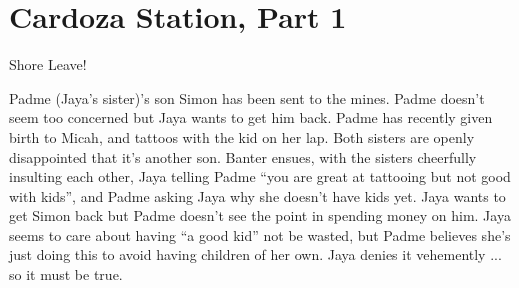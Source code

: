 \setcounter{chapter}{ 2 }
\chapter{\textbf{Cardoza Station, Part 1} }





\noindent\hrulefill





 {\LARGE Shore Leave! } 



Padme (Jaya's sister)'s son Simon has been sent to the mines.  Padme doesn't seem too concerned but Jaya wants to get him back.  Padme has recently given birth to Micah, and tattoos with the kid on her lap.  Both sisters are openly disappointed that it's another son.  Banter ensues, with the sisters cheerfully insulting each other, Jaya telling Padme ``you are great at tattooing but not good with kids'', and Padme asking Jaya why she doesn't have kids yet.  Jaya wants to get Simon back but Padme doesn't see the point in spending money on him.  Jaya seems to care about having ``a good kid'' not be wasted, but Padme believes she's just doing this to avoid having children of her own.  Jaya denies it vehemently ... so it must be true.



